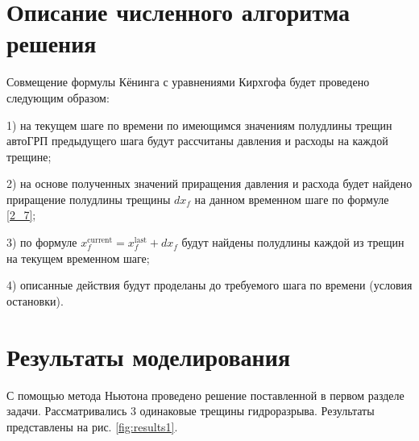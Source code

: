 \section{Описание численного алгоритма решения}

Совмещение формулы Кёнинга с уравнениями Кирхгофа будет проведено следующим образом:

1) на текущем шаге по времени по имеющимся значениям полудлины трещин автоГРП предыдущего шага будут рассчитаны давления и расходы на каждой трещине;

2) на основе полученных значений приращения давления и расхода будет найдено приращение полудлины трещины $dx_{\!f}$ на данном временном шаге по формуле \eqref{2_7};

3) по формуле $x_{\!f}^{\text{current}}=x_{\!f}^{\text{last}}+dx_{\!f}$ будут найдены полудлины каждой из трещин на текущем временном шаге;

4) описанные действия будут проделаны до требуемого шага по времени (условия остановки).

\section{Результаты моделирования}

С помощью метода Ньютона проведено решение поставленной в первом разделе задачи.
Рассматривались 3 одинаковые трещины гидроразрыва.
Результаты представлены на рис. \ref{fig:results1}.

